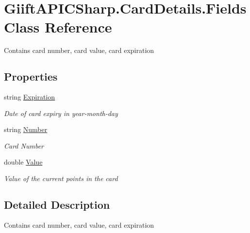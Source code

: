 \hypertarget{class_giift_a_p_i_c_sharp_1_1_card_details_1_1_fields}{}\section{Giift\+A\+P\+I\+C\+Sharp.\+Card\+Details.\+Fields Class Reference}
\label{class_giift_a_p_i_c_sharp_1_1_card_details_1_1_fields}


Contains card number, card value, card expiration  


\subsection*{Properties}
\begin{DoxyCompactItemize}
\item 
string \hyperlink{class_giift_a_p_i_c_sharp_1_1_card_details_1_1_fields_a46e9f4f8d749bf55b097a683a5c65c75}{Expiration}
\begin{DoxyCompactList}\small\item\em Date of card expiry in year-\/month-\/day \end{DoxyCompactList}\item 
string \hyperlink{class_giift_a_p_i_c_sharp_1_1_card_details_1_1_fields_ae92e5716a57df5eff049dfbce327f1b4}{Number}
\begin{DoxyCompactList}\small\item\em Card Number \end{DoxyCompactList}\item 
double \hyperlink{class_giift_a_p_i_c_sharp_1_1_card_details_1_1_fields_abb3d6732f6559529a84a72e99e3fd67f}{Value}
\begin{DoxyCompactList}\small\item\em Value of the current points in the card \end{DoxyCompactList}\end{DoxyCompactItemize}


\subsection{Detailed Description}
Contains card number, card value, card expiration 



